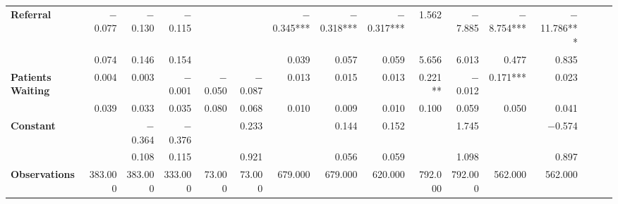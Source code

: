 \begin{tabular}{@{\extracolsep{5pt}}lrrrrrrrrrrrrrrr}
{\bf Referral} & $-$0.077\phantom{\phantom{)}***} & $-$0.130\phantom{\phantom{)}***} & $-$0.115\phantom{\phantom{)}***} & \phantom{***} & \phantom{***} & $-$0.345\phantom{)}*** & $-$0.318\phantom{)}*** & $-$0.317\phantom{)}*** & 1.562\phantom{\phantom{)}***} & $-$7.885\phantom{\phantom{)}***} & $-$8.754\phantom{)}*** & $-$11.786\phantom{)}*** \\
{\bf } & 0.074\phantom{\phantom{)}***} & 0.146\phantom{\phantom{)}***} & 0.154\phantom{\phantom{)}***} & \phantom{***} & \phantom{***} & 0.039\phantom{\phantom{)}***} & 0.057\phantom{\phantom{)}***} & 0.059\phantom{\phantom{)}***} & 5.656\phantom{\phantom{)}***} & 6.013\phantom{\phantom{)}***} & 0.477\phantom{\phantom{)}***} & 0.835\phantom{\phantom{)}***} \\
{\bf Patients Waiting} & 0.004\phantom{\phantom{)}***} & 0.003\phantom{\phantom{)}***} & $-$0.001\phantom{\phantom{)}***} & $-$0.050\phantom{\phantom{)}***} & $-$0.087\phantom{\phantom{)}***} & 0.013\phantom{\phantom{)}***} & 0.015\phantom{\phantom{)}***} & 0.013\phantom{\phantom{)}***} & 0.221\phantom{)}**\phantom{*} & $-$0.012\phantom{\phantom{)}***} & 0.171\phantom{)}*** & 0.023\phantom{\phantom{)}***} \\
{\bf } & 0.039\phantom{\phantom{)}***} & 0.033\phantom{\phantom{)}***} & 0.035\phantom{\phantom{)}***} & 0.080\phantom{\phantom{)}***} & 0.068\phantom{\phantom{)}***} & 0.010\phantom{\phantom{)}***} & 0.009\phantom{\phantom{)}***} & 0.010\phantom{\phantom{)}***} & 0.100\phantom{\phantom{)}***} & 0.059\phantom{\phantom{)}***} & 0.050\phantom{\phantom{)}***} & 0.041\phantom{\phantom{)}***} \\
{\bf Constant} & \phantom{***} & $-$0.364\phantom{\phantom{)}***} & $-$0.376\phantom{\phantom{)}***} & \phantom{***} & 0.233\phantom{\phantom{)}***} & \phantom{***} & 0.144\phantom{\phantom{)}***} & 0.152\phantom{\phantom{)}***} & \phantom{***} & 1.745\phantom{\phantom{)}***} & \phantom{***} & $-$0.574\phantom{\phantom{)}***} \\
{\bf } & \phantom{***} & 0.108\phantom{\phantom{)}***} & 0.115\phantom{\phantom{)}***} & \phantom{***} & 0.921\phantom{\phantom{)}***} & \phantom{***} & 0.056\phantom{\phantom{)}***} & 0.059\phantom{\phantom{)}***} & \phantom{***} & 1.098\phantom{\phantom{)}***} & \phantom{***} & 0.897\phantom{\phantom{)}***} \\
{\bf Observations} & 383.000\phantom{\phantom{)}***} & 383.000\phantom{\phantom{)}***} & 333.000\phantom{\phantom{)}***} & 73.000\phantom{\phantom{)}***} & 73.000\phantom{\phantom{)}***} & 679.000\phantom{\phantom{)}***} & 679.000\phantom{\phantom{)}***} & 620.000\phantom{\phantom{)}***} & 792.000\phantom{\phantom{)}***} & 792.000\phantom{\phantom{)}***} & 562.000\phantom{\phantom{)}***} & 562.000\phantom{\phantom{)}***} \\

\end{tabular}

